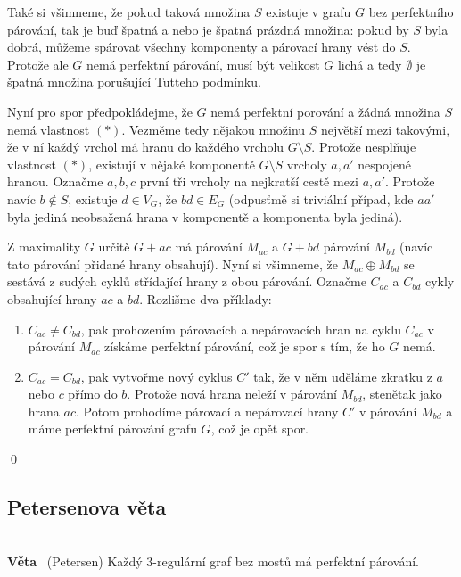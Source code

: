 \documentclass{article}
\renewcommand{\paragraph}[1]{\ \\\smallskip\noindent\textbf{#1}\ }
\begin{document}
\bigskip

Také si všimneme, že pokud taková množina $S$ existuje v grafu $G$ bez 
perfektního párování, tak je buď špatná a nebo je špatná prázdná množina: pokud 
by $S$ byla dobrá, můžeme spárovat všechny komponenty a párovací hrany vést do 
$S$.  Protože ale $G$ nemá perfektní párování, musí být velikost $G$ lichá a 
tedy $\emptyset$ je špatná množina porušující Tutteho podmínku.

Nyní pro spor předpokládejme, že $G$ nemá perfektní porování a žádná množina $S$ 
nemá vlastnost $(*)$. Vezměme tedy nějakou množinu $S$ největší mezi takovými, 
že v ní každý vrchol má hranu do každého vrcholu $G\setminus S$. Protože 
nesplňuje vlastnost $(*)$, existují v nějaké komponentě $G\setminus S$ vrcholy 
$a,a'$ nespojené hranou. Označme $a,b,c$ první tři vrcholy na nejkratší cestě 
mezi $a,a'$. Protože navíc $b \notin S$, existuje $d \in V_G$, že $bd\in E_G$ 
(odpusťmě si triviální případ, kde $aa'$ byla jediná neobsažená hrana v 
komponentě a komponenta byla jediná).

Z maximality $G$ určitě $G+ac$ má párování $M_{ac}$ a $G+bd$ párování $M_{bd}$ 
(navíc tato párování přidané hrany obsahují). Nyní si všimneme, že $M_{ac} 
\oplus M_{bd}$ se sestává z sudých cyklů střídající hrany z obou párování.  
Označme $C_{ac}$ a $C_{bd}$ cykly obsahující hrany $ac$ a $bd$. Rozlišme dva 
příklady:

\begin{enumerate}
	\item $C_{ac} \neq C_{bd}$, pak prohozením párovacích a nepárovacích hran na 
	cyklu $C_{ac}$ v párování $M_{ac}$ získáme perfektní párování, což je spor s 
	tím, že ho $G$ nemá.
	\item $C_{ac} = C_{bd}$, pak vytvořme nový cyklus $C'$ tak, že v něm uděláme 
	zkratku z $a$ nebo $c$ přímo do $b$. Protože nová hrana neleží v párování 
	$M_{bd}$, stenětak jako hrana $ac$. Potom prohodíme párovací a nepárovací 
	hrany $C'$ v párování $M_{bd}$ a máme perfektní párování grafu $G$, což je 
	opět spor.
\end{enumerate}
\qed

\subsection{Petersenova věta}
\paragraph{Věta} (Petersen)
Každý 3-regulární graf bez mostů má perfektní párování.
\end{document}
